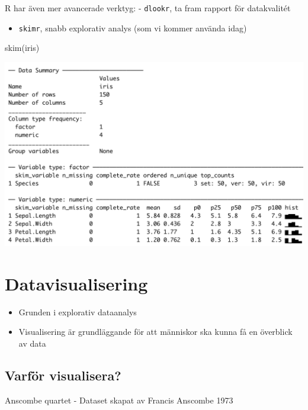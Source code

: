 \documentclass[
]{book}
\newenvironment{Shaded}{\begin{snugshade}}{\end{snugshade}}
\newcommand{\FunctionTok}[1]{\textcolor[rgb]{0.00,0.00,0.00}{#1}}
\newcommand{\NormalTok}[1]{#1}
\providecommand{\tightlist}{%
  \setlength{\itemsep}{0pt}\setlength{\parskip}{0pt}}
\begin{document}
R har även mer avancerade verktyg:
- \texttt{dlookr}, ta fram rapport för datakvalitét

\begin{itemize}
\tightlist
\item
  \texttt{skimr}, snabb explorativ analys (som vi kommer använda idag)
\end{itemize}

\begin{Shaded}
\begin{Highlighting}[]
\FunctionTok{skim}\NormalTok{(iris)}
\end{Highlighting}
\end{Shaded}

\includegraphics{images/Iris_skim.png}

\hypertarget{datavisualisering}{%
\section{Datavisualisering}\label{datavisualisering}}

\begin{itemize}
\item
  Grunden i explorativ dataanalys
\item
  Visualisering är grundläggande för att människor ska kunna få en överblick av data
\end{itemize}

\hypertarget{varfuxf6r-visualisera}{%
\subsection{Varför visualisera?}\label{varfuxf6r-visualisera}}

Anscombe quartet - Dataset skapat av Francis Anscombe 1973
\end{document}
